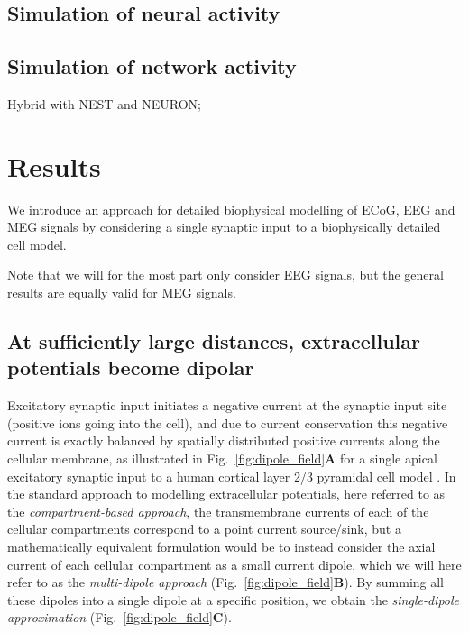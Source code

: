 \documentclass[preprint,10pt,authoryear]{elsarticle}
\begin{document}
\subsection{Simulation of neural activity} \label{subsec:neuron_models}

\subsection{Simulation of network activity}
Hybrid with NEST and NEURON;
\section{Results}\label{sec:results}
\normalsize

We introduce an approach for detailed biophysical modelling of ECoG, EEG and MEG signals by considering a single synaptic input to a biophysically detailed cell model. 

Note that we will for the most part only consider EEG signals, but the general results are equally valid for MEG signals.

\subsection{At sufficiently large distances, extracellular potentials become dipolar}\label{subsec:cb_db_comp_inf}

Excitatory synaptic input initiates a negative current at the synaptic input site (positive ions going into the cell), and due to current conservation \citep{NUNEZ2006} this negative current is exactly balanced by spatially distributed positive currents along the cellular membrane, as illustrated in Fig.~\ref{fig:dipole_field}\textbf{A} for a single apical excitatory synaptic input to a human cortical layer 2/3 pyramidal cell model \citep{EYAL2016}. In the standard approach to modelling extracellular potentials, here referred to as the {\it compartment-based approach}, the transmembrane currents of each of the cellular compartments correspond to a point current source/sink, but a mathematically equivalent formulation would be to instead consider the axial current of each cellular compartment as a small current dipole, which we will here refer to as the {\it multi-dipole approach} (Fig.~\ref{fig:dipole_field}\textbf{B}). By summing all these dipoles into a single dipole at a specific position, we obtain the {\it single-dipole approximation} (Fig.~\ref{fig:dipole_field}\textbf{C}).
\end{document}
